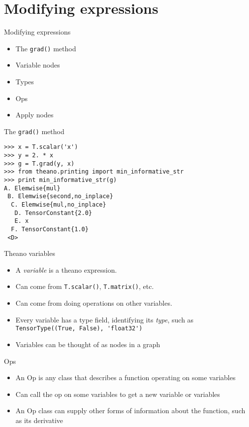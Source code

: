 \documentclass[utf8x,hyperref={pdfpagelabels=false}]{beamer}
\newcommand{\code}[1]{\lstinline[emph={[2]}]|#1|}
\begin{document}
\section{Modifying expressions}
\begin{frame}{Modifying expressions}
  \begin{itemize}
  \item The \code{grad()} method
  \item Variable nodes
  \item Types
  \item Ops
  \item Apply nodes
  \end{itemize}
\end{frame}

\begin{frame}[fragile]{The \code{grad()} method}
\begin{lstlisting}
>>> x = T.scalar('x')
>>> y = 2. * x
>>> g = T.grad(y, x)
>>> from theano.printing import min_informative_str
>>> print min_informative_str(g)
A. Elemwise{mul}
 B. Elemwise{second,no_inplace}
  C. Elemwise{mul,no_inplace}
   D. TensorConstant{2.0}
   E. x
  F. TensorConstant{1.0}
 <D>
\end{lstlisting}
\end{frame}

\begin{frame}{Theano variables}
  \begin{itemize}
  \item A \emph{variable} is a theano expression.
  \item Can come from \code{T.scalar()}, \code{T.matrix()}, etc.
  \item Can come from doing operations on other variables.
  \item Every variable has a type field, identifying its \emph{type}, such as \code{TensorType((True, False), 'float32')}
  \item Variables can be thought of as nodes in a graph
  \end{itemize}
\end{frame}

\begin{frame}{Ops}
  \begin{itemize}
  \item  An Op is any class that describes a function operating on some variables
  \item Can call the op on some variables to get a
new variable or variables
  \item An Op class can supply other forms of
information about the function, such as its
derivative
  \end{itemize}
\end{frame}
\end{document}
